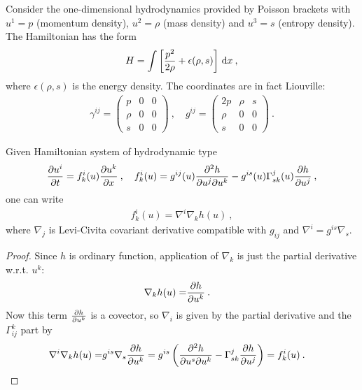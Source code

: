\begin{example}
    Consider the one-dimensional hydrodynamics provided by Poisson brackets with $u^1 = p$ (momentum density), $u^2 = \rho$ (mass density) and $u^3 = s$ (entropy density). The Hamiltonian has the form
    \begin{align}
        H = \int \left[ \frac{p^2}{2 \rho} + \epsilon(\rho,s) \right] \, \mathrm{d} x \:,
    \end{align}
    where $\epsilon(\rho,s)$ is the energy density. The coordinates are in fact Liouville:
    \begin{align}
        \gamma^{ij} = \begin{pmatrix}
            p & 0 & 0 \\ \rho & 0 & 0 \\ s & 0 & 0
        \end{pmatrix}
        \:, \quad
        g^{ij} = \begin{pmatrix}
            2p & \rho & s \\ \rho & 0 & 0 \\ s & 0 & 0
        \end{pmatrix}
        \:.
    \end{align}
\end{example}


\begin{proposition}
    Given Hamiltonian system of hydrodynamic type
    \begin{align}
        \frac{\partial u^i}{\partial t} = f^i_k(u) \frac{\partial u^k}{\partial x} \:, \quad f^i_k(u) = g^{ij}(u) \frac{\partial^2 h}{\partial u^j \partial u^k} - g^{is}(u) \Gamma^j_{sk}(u) \frac{\partial h}{\partial u^j} \:, \label{eq:hamiltonovsky-system}
    \end{align}
    one can write
    \begin{align}
        f^i_k(u) = \nabla^i \nabla_k h(u) \:, 
    \end{align}
    where $\nabla_j$ is Levi-Civita covariant derivative compatible with $g_{ij}$ and $\nabla^i = g^{is} \nabla_s$. 
\end{proposition}
\begin{proof}
    Since $h$ is ordinary function, application of $\nabla_k$ is just the partial derivative w.r.t. $u^k$:
    \begin{align}
        \nabla_k h(u) =& \frac{\partial h}{\partial u^k} \:.
    \end{align}
    Now this term $\frac{\partial h}{\partial u^k}$ is a covector, so $\nabla_i$ is given by the partial derivative and the $\Gamma_{ij}^k$ part by
    \begin{align}
        \nabla^i \nabla_k h(u) =& g^{is} \nabla_s \frac{\partial h}{\partial u^k} = g^{is} \left( \frac{\partial^2 h}{\partial u^s \partial u^k} - \Gamma^j_{sk} \frac{\partial h}{\partial u^j} \right) = f^i_k(u) \:.
    \end{align}
\end{proof}
